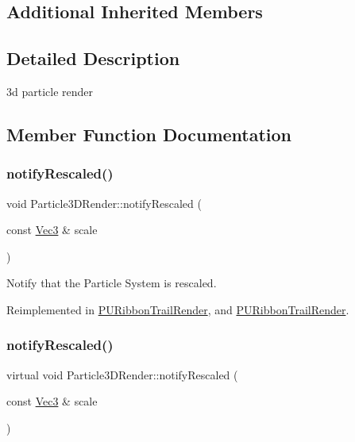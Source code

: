 \subsection*{Additional Inherited Members}


\subsection{Detailed Description}
3d particle render 

\subsection{Member Function Documentation}
\mbox{\label{classParticle3DRender_a47e83d2bfea30ffbbaff7ff6526f5047}} 
\subsubsection{\texorpdfstring{notify\+Rescaled()}{notifyRescaled()}\hspace{0.1cm}{\footnotesize\ttfamily [1/2]}}
{\footnotesize\ttfamily void Particle3\+D\+Render\+::notify\+Rescaled (\begin{DoxyParamCaption}\item[{const \hyperlink{classVec3}{Vec3} \&}]{scale }\end{DoxyParamCaption})\hspace{0.3cm}{\ttfamily [virtual]}}

Notify that the Particle System is rescaled. 

Reimplemented in \hyperlink{classPURibbonTrailRender_aeb5cf442af12f6f2593f1b9020281577}{P\+U\+Ribbon\+Trail\+Render}, and \hyperlink{classPURibbonTrailRender_a84442c6a329c8a1318c35655e18fdf69}{P\+U\+Ribbon\+Trail\+Render}.

\mbox{\label{classParticle3DRender_ac68901a08643ebcbe115042011bc6119}} 
\subsubsection{\texorpdfstring{notify\+Rescaled()}{notifyRescaled()}\hspace{0.1cm}{\footnotesize\ttfamily [2/2]}}
{\footnotesize\ttfamily virtual void Particle3\+D\+Render\+::notify\+Rescaled (\begin{DoxyParamCaption}\item[{const \hyperlink{classVec3}{Vec3} \&}]{scale }\end{DoxyParamCaption})\hspace{0.3cm}{\ttfamily [virtual]}}


